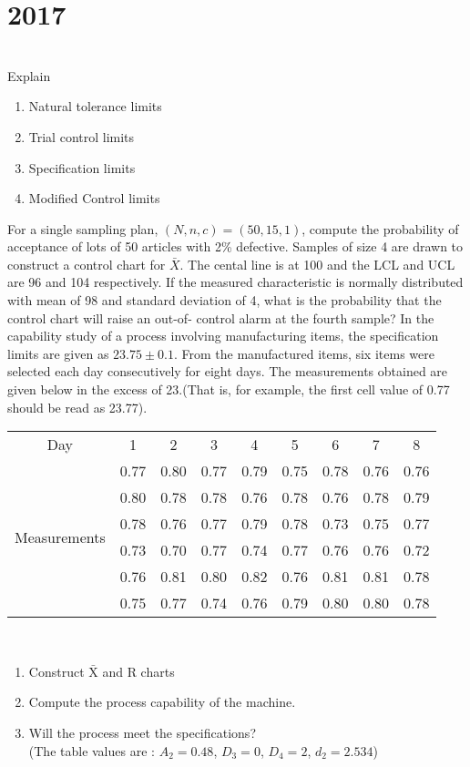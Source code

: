 \section*{2017}
\vspace{-.5cm}
\hrulefill \smallskip\\
 Explain
\begin{enumerate}[topsep=0pt, itemsep = -1ex,label=(\roman*)]
    \item Natural tolerance limits
    \item Trial control limits
    \item Specification limits
    \item Modified Control limits
\end{enumerate}
\myline
{} For a single sampling plan, $(N,n,c)=(50,15,1)$, compute the probability of acceptance of lots of 50 articles with 2\% defective.
\myline
{} Samples of size 4 are drawn to construct a control chart for $\bar{X}$. The cental line is at 100 and the LCL and UCL are 96 and 104 respectively. If the measured characteristic is normally distributed with mean of 98 and standard deviation of 4, what is the probability that the control chart will raise an out-of- control alarm at the fourth sample?
\myline
{} In the capability study of a process involving manufacturing items, the specification limits are given as $23.75\pm0.1$. From the manufactured items, six items were selected each day consecutively for eight days. The measurements obtained are given below in the excess of 23.(That is, for example, the first cell value of 0.77 should be read as 23.77).\\
\begin{tabular}{c|*{8}{c|}} \cline{2-9}
Day & 1 & 2 & 3 & 4 & 5 & 6 & 7 & 8 \\ \cline{2-9}
\multirow{6}{*}{Measurements}& 0.77 & 0.80 & 0.77 & 0.79 & 0.75 & 0.78 & 0.76 & 0.76 \\
& 0.80 & 0.78 & 0.78 & 0.76 & 0.78 & 0.76 & 0.78 & 0.79 \\
& 0.78 & 0.76 & 0.77 & 0.79 & 0.78 & 0.73 & 0.75 & 0.77 \\
& 0.73 & 0.70 & 0.77 & 0.74 & 0.77 & 0.76 & 0.76 & 0.72 \\
& 0.76 & 0.81 & 0.80 & 0.82 & 0.76 & 0.81 & 0.81 & 0.78 \\
& 0.75 & 0.77 & 0.74 & 0.76 & 0.79 & 0.80 & 0.80 & 0.78 \\\cline{2-9}
\end{tabular} \\
\begin{enumerate}[topsep=0pt, itemsep = -1ex,label=(\roman*)]
    \item Construct $\bar{\text{X}}$ and R charts
    \item Compute the process capability of the machine.
    \item Will the process meet the specifications?\\(The table values are : $A_2=0.48$, $D_3 = 0$, $D_4=2$, $d_2 = 2.534$)
\end{enumerate}